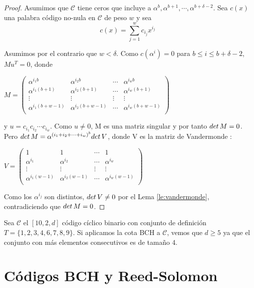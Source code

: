 \begin{proof}
Asumimos que $\mathcal{C}$ tiene ceros que incluye a $\alpha^b,\alpha^{b+1}, \cdots , \alpha^{b+\delta-2}$. Sea $c(x)$ una palabra código no-nula en $\mathcal{C}$ de peso $w$ y sea 
\[ 
	c(x) = \sum_{j=1}^w c_{i_j}x^{i_j}
\]

Asumimos por el contrario que $w < \delta$. Como $c(\alpha^i) = 0$ para $ b \leq i \leq b+\delta -2$, $Mu^T = 0$, donde 

$ M = \begin{pmatrix}
	 \alpha^{i_1b} & \alpha^{i_2b} & \cdots & \alpha^{i_wb} \\
	 \alpha^{i_1(b+1)} & \alpha^{i_2(b+1)} & \cdots  & \alpha^{i_w(b+1)} \\
	 \vdots & \vdots & \vdots & \vdots  \\
     \alpha^{i_1(b+w-1)} & \alpha^{i_2(b+w-1)} & \cdots  & \alpha^{i_w(b+w-1)} \\
	\end{pmatrix}$
	
y $u=c_{i_1}c_{i_2}\cdots c_{i_w}$. Como $u \neq 0$, M es una matriz singular y por tanto $det \thinspace M = 0$. Pero $det \thinspace M = \alpha^{(i_1+i_2+\cdots + i_w)^b}det \thinspace V$, donde V es la matriz de Vandermonde :

$ V = \begin{pmatrix}
	 1 & 1 & \cdots & 1 \\
	 \alpha^{i_1} & \alpha^{i_2} & \cdots  & \alpha^{i_w} \\
	 \vdots & \vdots & \vdots & \vdots  \\
     \alpha^{i_1(w-1)} & \alpha^{i_2(w-1)} & \cdots  & \alpha^{i_w(w-1)} \\
	\end{pmatrix}$
	
Como los $\alpha^{i_j}$ son distintos, $det \thinspace V \neq 0$ por el Lema \ref{le:vandermonde}, contradiciendo que $det \thinspace M = 0$.
\end{proof}


\begin{exampleth}
Sea $\mathcal{C}$ el $[10,2,d]$ código cíclico binario con conjunto de definición $T = \{ 1,2,3,4,6,7,8,9 \}$. Si aplicamos la cota BCH a $\mathcal{C}$, vemos que $d \geq 5$ ya que el conjunto con más elementos consecutivos es de tamaño 4. 
\end{exampleth}

\section{Códigos BCH y Reed-Solomon}

